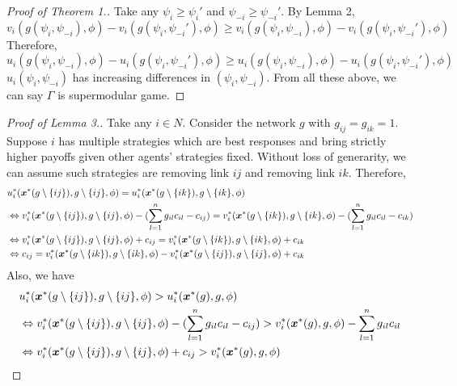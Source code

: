 \documentclass[12pt]{article}
\theoremstyle{definition}
\begin{document}
\begin{proof}[Proof of Theorem 1.]
	Take any $\psi_i \ge \psi_i'$ and $\psi_{-i} \ge \psi_{-i}'$.
	By Lemma 2,
	\[ v_i(g(\psi_i, \psi_{-i}), \phi) - v_i(g(\psi_i, \psi_{-i}'),\phi) \ge v_i(g(\psi_i, \psi_{-i}), \phi) - v_i(g(\psi_i, \psi_{-i}'),\phi) \]
	Therefore,
	\[ u_i(g(\psi_i, \psi_{-i}), \phi) - u_i(g(\psi_i, \psi_{-i}'),\phi) \ge u_i(g(\psi_i, \psi_{-i}), \phi) - u_i(g(\psi_i, \psi_{-i}'),\phi) \]
	$u_i(\psi_i, \psi_{-i})$ has increasing differences in $(\psi_i, \psi_{-i})$.
	From all these above, we can say $\Gamma$ is supermodular game.
\end{proof}

\begin{proof}[Proof of Lemma 3.]
	Take any $i \in N$.
	Consider the network $g$ with $g_{ij} = g_{ik} = 1$.
	Suppose $i$ has multiple strategies which are best responses and bring strictly higher payoffs given other agents' strategies fixed.
	Without loss of generarity, we can assume such strategies are removing link $ij$ and removing link $ik$.
	Therefore,
	\begin{align}
		\label{lemma3-1}
		& u_i^*(\bm{x}^*(g \setminus \{ij\}), g \setminus \{ij\}, \phi) = u_i^*(\bm{x}^*(g \setminus \{ik\}), g \setminus \{ik\}, \phi) \notag \\
			& \Leftrightarrow v_i^*(\bm{x}^*(g \setminus \{ij\}), g \setminus \{ij\}, \phi) - (\sum_{l=1}^n g_{il} c_{il} - c_{ij}) = v_i^*(\bm{x}^*(g \setminus \{ik\}), g \setminus \{ik\}, \phi) - (\sum_{l=1}^n g_{il} c_{il} - c_{ik}) \notag \\
			& \Leftrightarrow v_i^*(\bm{x}^*(g \setminus \{ij\}), g \setminus \{ij\}, \phi) + c_{ij} = v_i^*(\bm{x}^*(g \setminus \{ik\}), g \setminus \{ik\}, \phi) + c_{ik} \notag \\
			& \Leftrightarrow c_{ij} = v_i^*(\bm{x}^*(g \setminus \{ik\}), g \setminus \{ik\}, \phi) - v_i^*(\bm{x}^*(g \setminus \{ij\}), g \setminus \{ij\}, \phi) + c_{ik}
	\end{align}
	Also, we have
	\begin{align}
		\label{lemma3-2}
		& u_i^*(\bm{x}^*(g \setminus \{ij\}), g \setminus \{ij\}, \phi) > u_i^*(\bm{x}^*(g), g, \phi) \notag \\
			& \Leftrightarrow v_i^*(\bm{x}^*(g \setminus \{ij\}), g \setminus \{ij\}, \phi) - (\sum_{l=1}^n g_{il} c_{il} - c_{ij}) > v_i^*(\bm{x}^*(g), g, \phi) - \sum_{l=1}^n g_{il} c_{il} \notag \\
			& \Leftrightarrow v_i^*(\bm{x}^*(g \setminus \{ij\}), g \setminus \{ij\}, \phi) + c_{ij} > v_i^*(\bm{x}^*(g), g, \phi) \notag \\

\end{align}
\end{proof}
\end{document}
